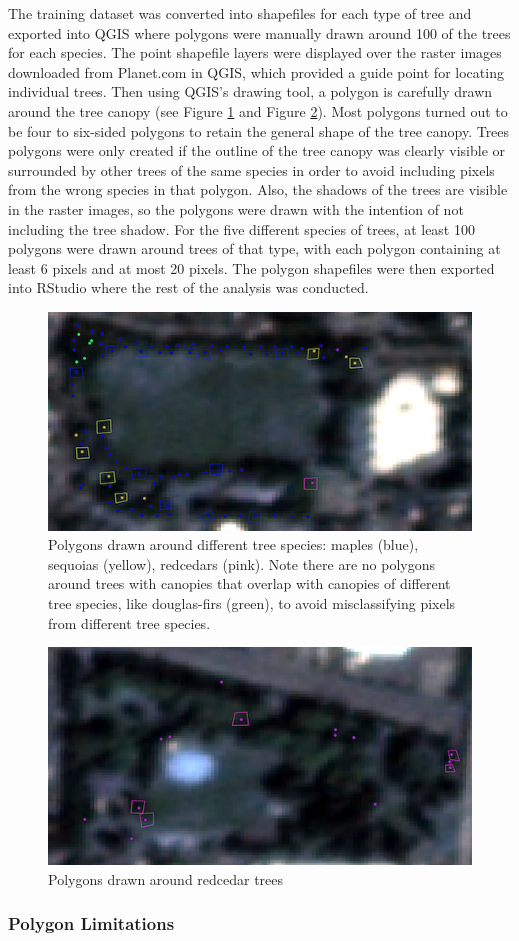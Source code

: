 \documentclass[12pt,twoside]{reedthesis}
\begin{document}
The training dataset was converted into shapefiles for each type of tree and exported into QGIS where polygons were manually drawn around 100 of the trees for each species. The point shapefile layers were displayed over the raster images downloaded from Planet.com in QGIS, which provided a guide point for locating individual trees. Then using QGIS's drawing tool, a polygon is carefully drawn around the tree canopy (see Figure \ref{fig:polyimage} and Figure \ref{fig:redcedar}). Most polygons turned out to be four to six-sided polygons to retain the general shape of the tree canopy. Trees polygons were only created if the outline of the tree canopy was clearly visible or surrounded by other trees of the same species in order to avoid including pixels from the wrong species in that polygon. Also, the shadows of the trees are visible in the raster images, so the polygons were drawn with the intention of not including the tree shadow. For the five different species of trees, at least 100 polygons were drawn around trees of that type, with each polygon containing at least 6 pixels and at most 20 pixels. The polygon shapefiles were then exported into RStudio where the rest of the analysis was conducted.
\begin{figure}

{\centering \includegraphics[width=0.5\linewidth]{figure/polyimage} 

}

\caption{Polygons drawn around different tree species: maples (blue), sequoias (yellow), redcedars (pink). Note there are no polygons around trees with canopies that overlap with canopies of different tree species, like douglas-firs (green), to avoid misclassifying pixels from different tree species.}\label{fig:polyimage}
\end{figure}
\begin{figure}

{\centering \includegraphics[width=0.5\linewidth]{figure/redcedar} 

}

\caption{Polygons drawn around redcedar trees}\label{fig:redcedar}
\end{figure}
\hypertarget{polygon-limitations}{%
\subsubsection{Polygon Limitations}\label{polygon-limitations}}
\end{document}
